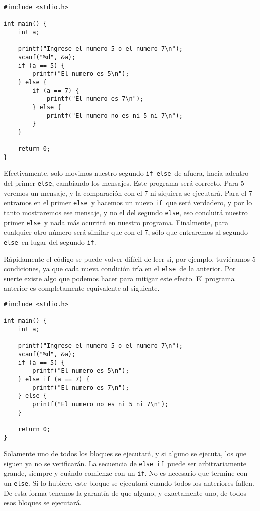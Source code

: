 \documentclass[10pt]{article}
\newcommand{\cif}[0]{\lstinline{if}}
\newcommand{\celse}[0]{\lstinline{else}}
\begin{document}
\begin{lstlisting}
#include <stdio.h>

int main() {
	int a;

	printf("Ingrese el numero 5 o el numero 7\n");
	scanf("%d", &a);
	if (a == 5) {
		printf("El numero es 5\n");
	} else {
		if (a == 7) {
			printf("El numero es 7\n");
		} else {
			printf("El numero no es ni 5 ni 7\n");
		}
	}

	return 0;
}
\end{lstlisting}

Efectivamente, solo movimos nuestro segundo \cif\ \celse\ de afuera, hacia adentro del primer \celse, cambiando los mensajes. Este programa será correcto. Para 5 veremos un mensaje, y la comparación con el 7 ni siquiera se ejecutará. Para el 7 entramos en el primer \celse\ y hacemos un nuevo \cif\ que será verdadero, y por lo tanto mostraremos ese mensaje, y no el del segundo \celse, eso concluirá nuestro primer \celse\ y nada más ocurrirá en nuestro programa. Finalmente, para cualquier otro número será similar que con el 7, sólo que entraremos al segundo \celse\ en lugar del segundo \cif.

\bigskip

Rápidamente el código se puede volver difícil de leer si, por ejemplo, tuviéramos 5 condiciones, ya que cada nueva condición iría en el \celse\ de la anterior. Por suerte existe algo que podemos hacer para mitigar este efecto. El programa anterior es completamente equivalente al siguiente.

\begin{lstlisting}
#include <stdio.h>

int main() {
	int a;

	printf("Ingrese el numero 5 o el numero 7\n");
	scanf("%d", &a);
	if (a == 5) {
		printf("El numero es 5\n");
	} else if (a == 7) {
		printf("El numero es 7\n");
	} else {
		printf("El numero no es ni 5 ni 7\n");
	}

	return 0;
}
\end{lstlisting}

Solamente uno de todos los bloques se ejecutará, y si alguno se ejecuta, los que siguen ya no se verificarán. La secuencia de \celse\ \cif\ puede ser arbitrariamente grande, siempre y cuándo comienze con un \cif. No es necesario que termine con un \celse. Si lo hubiere, este bloque se ejecutará cuando todos los anteriores fallen. De esta forma tenemos la garantía de que alguno, y exactamente uno, de todos esos bloques se ejecutará.
\end{document}
